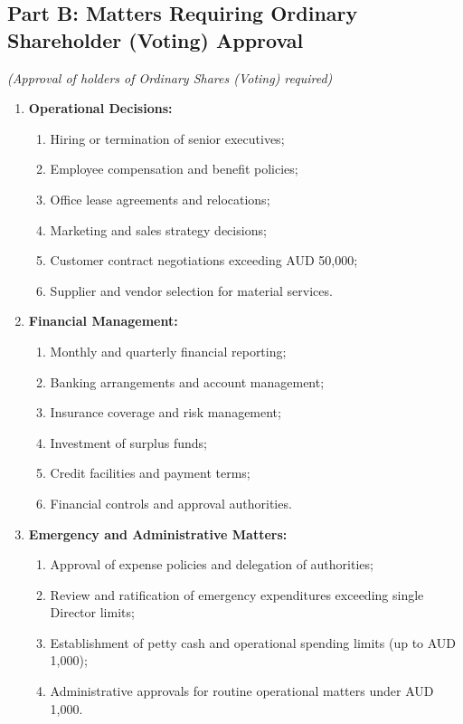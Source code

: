 \subsection*{Part B: Matters Requiring Ordinary Shareholder (Voting) Approval}
\textit{(Approval of holders of Ordinary Shares (Voting) required)}

\begin{enumerate}[label=\arabic*.]
    \item \textbf{Operational Decisions:}
        \begin{enumerate}[label=(\alph*)]
            \item Hiring or termination of senior executives;
            \item Employee compensation and benefit policies;
            \item Office lease agreements and relocations;
            \item Marketing and sales strategy decisions;
            \item Customer contract negotiations exceeding AUD 50,000;
            \item Supplier and vendor selection for material services.
        \end{enumerate}

    \item \textbf{Financial Management:}
        \begin{enumerate}[label=(\alph*)]
            \item Monthly and quarterly financial reporting;
            \item Banking arrangements and account management;
            \item Insurance coverage and risk management;
            \item Investment of surplus funds;
            \item Credit facilities and payment terms;
            \item Financial controls and approval authorities.
        \end{enumerate}

    \item \textbf{Emergency and Administrative Matters:}
        \begin{enumerate}[label=(\alph*)]
            \item Approval of expense policies and delegation of authorities;
            \item Review and ratification of emergency expenditures exceeding single Director limits;
            \item Establishment of petty cash and operational spending limits (up to AUD 1,000);
            \item Administrative approvals for routine operational matters under AUD 1,000.
        \end{enumerate}
\end{enumerate}

